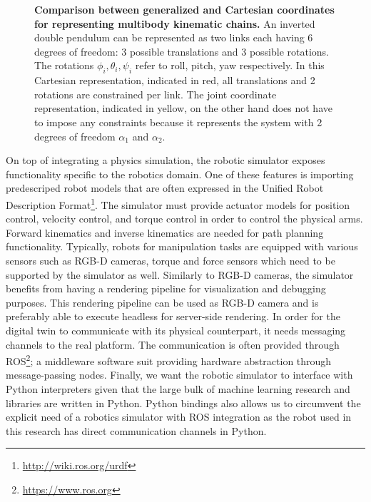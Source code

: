 \documentclass[\home/main.tex]{subfiles}
\begin{document}
\begin{figure}
    \centering
    
    \caption[Comparison between generalized and Cartesian coordinates for representing multibody kinematic chains.]{\textbf{Comparison between generalized and Cartesian coordinates for representing multibody kinematic chains.} An inverted double pendulum can be represented as two links each having 6 degrees of freedom: 3 possible translations and 3 possible rotations. The rotations $\phi_i, \theta_i, \psi_i$ refer to roll, pitch, yaw respectively. In this \textcolor{ColorAccent1Strong}{Cartesian representation}, indicated in \textcolor{ColorAccent1Strong}{red}, all translations and 2 rotations are constrained per link. The \textcolor{ColorAccent2Strong}{joint coordinate representation}, indicated in \textcolor{ColorAccent2Strong}{yellow}, on the other hand does not have to impose any constraints because it represents the system with 2 degrees of freedom $\alpha_1$ and $\alpha_2$.}
    \label{fig:generalized_vs_cartesian_coordinates}
\end{figure}

On top of integrating a physics simulation, the robotic simulator exposes functionality specific to the robotics domain.
One of these features is importing predescriped robot models that are often expressed in the Unified Robot Description Format\footnote{\url{http://wiki.ros.org/urdf}}.
The simulator must provide actuator models for position control, velocity control, and torque control in order to control the physical arms.
Forward kinematics and inverse kinematics are needed for path planning functionality.
Typically, robots for manipulation tasks are equipped with various sensors such as RGB-D cameras, torque and force sensors which need to be supported by the simulator as well.
Similarly to RGB-D cameras, the simulator benefits from having a rendering pipeline for visualization and debugging purposes. This rendering pipeline can be used as RGB-D camera and is preferably able to execute headless for server-side rendering.
In order for the digital twin to communicate with its physical counterpart, it needs messaging channels to the real platform. The communication is often provided through ROS\footnote{\url{https://www.ros.org}}; a middleware software suit providing hardware abstraction through message-passing nodes.
Finally, we want the robotic simulator to interface with Python interpreters given that the large bulk of machine learning research and libraries are written in Python. Python bindings also allows us to circumvent the explicit need of a robotics simulator with ROS integration as the robot used in this research has direct communication channels in Python.
\end{document}
